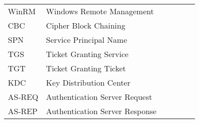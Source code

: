 \begin{flushleft}
\begin{tabular}{l p{0.8\linewidth}}
WinRM    & Windows Remote Management\\
CBC      & Cipher Block Chaining\\
SPN      & Service Principal Name\\
TGS      & Ticket Granting Service\\
TGT      & Ticket Granting Ticket\\
KDC      & Key Distribution Center\\
AS-REQ   & Authentication Server Request\\
AS-REP   & Authentication Server Response\\
\end{tabular}
\end{flushleft}